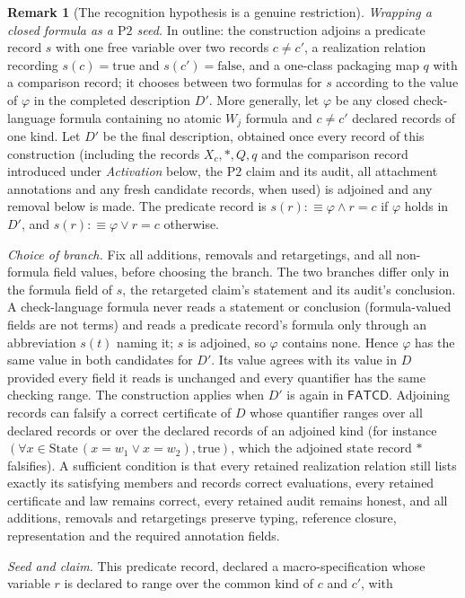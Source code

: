 \documentclass[11pt]{article}
\theoremstyle{definition}
\newtheorem{remark}[theorem]{Remark}
\newcommand{\FATCD}{\ensuremath{\mathsf{FATCD}}}
\newcommand{\Ptwo}{\ensuremath{\mathrm{P2}}}
\begin{document}
\begin{remark}[The recognition hypothesis is a genuine restriction]
\emph{Wrapping a closed formula as a \Ptwo{} seed.} In outline: the construction adjoins a predicate record \(s\) with one free variable over two records \(c\ne c'\), a realization relation recording \(s(c)=\mathrm{true}\) and \(s(c')=\mathrm{false}\), and a one-class packaging map \(q\) with a comparison record; it chooses between two formulas for \(s\) according to the value of \(\varphi\) in the completed description \(D'\). More generally, let \(\varphi\) be any closed check-language formula containing
no atomic \(W_j\) formula and
\(c\ne c'\) declared records of one kind. Let \(D'\) be the final description, obtained once every record of this construction (including the records \(X_c,*,Q,q\) and the comparison record introduced under \emph{Activation} below, the \Ptwo{} claim and its audit, all attachment annotations and any fresh candidate records, when used) is adjoined and any removal below is made. The predicate record is \(s(r):\equiv\varphi\wedge r=c\) if \(\varphi\) holds in \(D'\), and \(s(r):\equiv\varphi\vee r=c\) otherwise. \par\emph{Choice of branch.} Fix all additions, removals and retargetings, and all non-formula field values, before choosing the branch. The two branches differ only in the formula field of \(s\), the retargeted claim's statement and its audit's conclusion. A check-language formula never reads a statement or conclusion (formula-valued fields are not terms) and reads a predicate record's formula only through an abbreviation \(s(t)\) naming it; \(s\) is adjoined, so \(\varphi\) contains none. Hence \(\varphi\) has the same value in both candidates for \(D'\). Its value agrees with its value in \(D\) provided every field it reads is unchanged and every quantifier has the same checking range. The construction applies when \(D'\) is again in \FATCD{}. Adjoining records can falsify a correct certificate of \(D\) whose quantifier ranges over all declared records or over the declared records of an adjoined kind (for instance \((\forall x\in\mathrm{State}\,(x=w_1\vee x=w_2),\mathrm{true})\), which the adjoined state record \(*\) falsifies). A sufficient condition is that every retained realization relation still lists exactly its satisfying members and records correct evaluations, every retained certificate and law remains correct, every retained audit remains honest, and all additions, removals and retargetings preserve typing, reference closure, representation and the required annotation fields. \par\emph{Seed and claim.} This predicate record, declared a macro-specification whose variable \(r\) is declared to range over the common kind of \(c\) and \(c'\), with

\end{remark}
\end{document}
